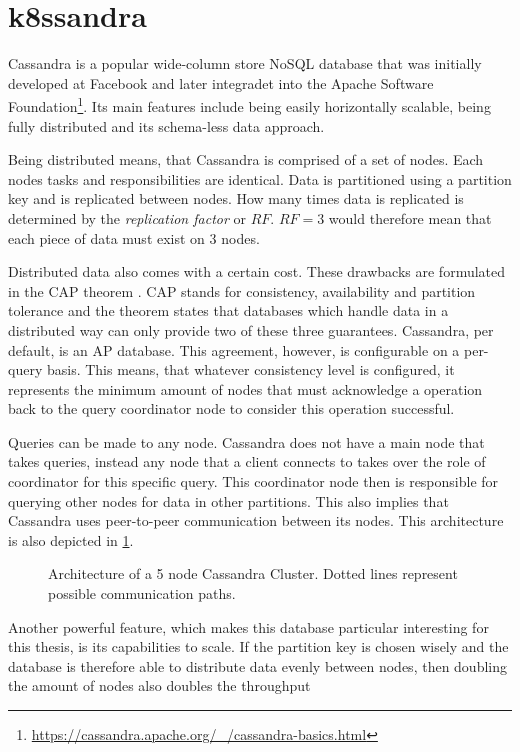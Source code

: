 \section{k8ssandra}
\label{sec:k8ssandra}

Cassandra is a popular wide-column store NoSQL database that was initially developed at Facebook and later integradet into the Apache Software Foundation\footnote{\url{https://cassandra.apache.org/_/cassandra-basics.html}\label{fn:cassandra-basics}}. Its main features include being easily horizontally scalable, being fully distributed and its schema-less data approach.

Being distributed means, that Cassandra is comprised of a set of nodes. Each nodes tasks and responsibilities are identical. Data is partitioned using a partition key and is replicated between nodes. How many times data is replicated is determined by the \textit{replication factor} or \(RF\). \(RF = 3\) would therefore mean that each piece of data must exist on 3 nodes.

Distributed data also comes with a certain cost. These drawbacks are formulated in the CAP theorem \cite{foxHarvestYieldScalable1999a}. CAP stands for consistency, availability and partition tolerance and the theorem states that databases which handle data in a distributed way can only provide two of these three guarantees. Cassandra, per default, is an AP database. This agreement, however, is configurable on a per-query basis. This means, that whatever consistency level is configured, it represents the minimum amount of nodes that must acknowledge a operation back to the query coordinator node to consider this operation successful.

Queries can be made to any node. Cassandra does not have a main node that takes queries, instead any node that a client connects to takes over the role of coordinator for this specific query. This coordinator node then is responsible for querying other nodes for data in other partitions. This also implies that Cassandra uses peer-to-peer communication between its nodes. This architecture is also depicted in \cref{fig:cassandra-architecture}.

\begin{figure}
    \centering
    \caption{Architecture of a 5 node Cassandra Cluster. Dotted lines represent possible communication paths.}
    \label{fig:cassandra-architecture}
\end{figure}

Another powerful feature, which makes this database particular interesting for this thesis, is its capabilities to scale. If the partition key is chosen wisely and the database is therefore able to distribute data evenly between nodes, then doubling the amount of nodes also doubles the throughput 

